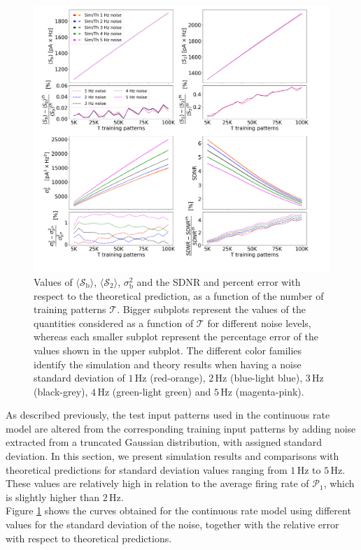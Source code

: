 \documentclass[a4paper, 12pt, twoside, openright]{book}
\newcommand{\popI}{\mathcal{P}_1}
\newcommand{\T}{\mathcal{T}}
\newcommand{\SII}{\mathcal{S}_\text{2}}
\newcommand{\Sb}{\mathcal{S}_\text{b}}
\newcommand{\varSb}{\sigma^{2}_\text{b}}
\begin{document}
\begin{figure}[H]
\centering\includegraphics[width=\columnwidth]{figures/lognormal.png}
\caption{Values of $\langle\Sb\rangle$, $\langle\SII\rangle$, $\varSb$ and the SDNR and percent error with respect to the theoretical prediction, as a function of the number of training patterns $\T$. 
Bigger subplots represent the values of the quantities considered as a function of $\T$ for different noise levels, whereas each smaller subplot represent the percentage error of the values shown in the upper subplot. The different color families identify the simulation and theory results when having a noise standard deviation of $1$\,Hz (red-orange), $2$\,Hz (blue-light blue), $3$\,Hz (black-grey), $4$\,Hz (green-light green) and $5$\,Hz (magenta-pink).
\label{fig:relative-error}}
\end{figure}

As described previously, the test input patterns used in the continuous rate model are altered from the corresponding training input patterns by adding noise extracted from a truncated Gaussian distribution, with assigned standard deviation. In this section, we present simulation results and comparisons with theoretical predictions for standard deviation values ranging from $1$\,Hz to $5$\,Hz.
These values are relatively high in relation to the average firing rate of $\popI$, which is slightly higher than $2$\,Hz.\\
Figure \ref{fig:relative-error} shows the curves obtained for the continuous rate model using different values for the standard deviation of the noise, together with the relative error with respect to theoretical predictions.
\end{document}
